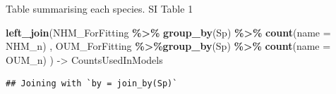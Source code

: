 \documentclass[
]{article}
\newenvironment{Shaded}{\begin{snugshade}}{\end{snugshade}}
\newcommand{\AttributeTok}[1]{\textcolor[rgb]{0.13,0.29,0.53}{#1}}
\newcommand{\FunctionTok}[1]{\textcolor[rgb]{0.13,0.29,0.53}{\textbf{#1}}}
\newcommand{\NormalTok}[1]{#1}
\newcommand{\OtherTok}[1]{\textcolor[rgb]{0.56,0.35,0.01}{#1}}
\newcommand{\SpecialCharTok}[1]{\textcolor[rgb]{0.81,0.36,0.00}{\textbf{#1}}}
\newcommand{\StringTok}[1]{\textcolor[rgb]{0.31,0.60,0.02}{#1}}
\begin{document}
Table summarising each species. SI Table 1

\begin{Shaded}
\begin{Highlighting}[]
\FunctionTok{left\_join}\NormalTok{(NHM\_ForFitting }\SpecialCharTok{\%\textgreater{}\%} \FunctionTok{group\_by}\NormalTok{(Sp) }\SpecialCharTok{\%\textgreater{}\%}
            \FunctionTok{count}\NormalTok{(}\AttributeTok{name =} \StringTok{\textquotesingle{}NHM\_n\textquotesingle{}}\NormalTok{) , }
\NormalTok{          OUM\_ForFitting }\SpecialCharTok{\%\textgreater{}\%}\FunctionTok{group\_by}\NormalTok{(Sp) }\SpecialCharTok{\%\textgreater{}\%}
            \FunctionTok{count}\NormalTok{(}\AttributeTok{name =} \StringTok{\textquotesingle{}OUM\_n\textquotesingle{}}\NormalTok{) ) }\OtherTok{{-}\textgreater{}}\NormalTok{ CountsUsedInModels}
\end{Highlighting}
\end{Shaded}

\begin{verbatim}
## Joining with `by = join_by(Sp)`
\end{verbatim}
\end{document}
